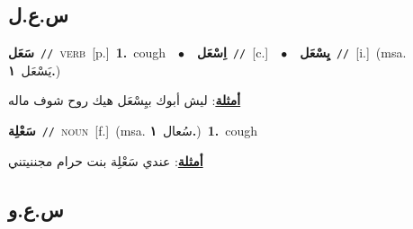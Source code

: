 \documentclass[10pt,a4paper,twoside]{article} %
\begin{document}
\begin{multicols}{2}
\vspace{-3mm}
\subsection*{\color{blue}\foreignlanguage{arabic}{س.ع.ل}\color{blue}{}} 

{\setlength\topsep{0pt}\textbf{\foreignlanguage{arabic}{سَعَل}}\ {\color{gray}\texttt{//}\color{black}}\ \textsc{verb}\ [p.]\ \textbf{1.}~cough\ \ $\bullet$\ \ \setlength\topsep{0pt}\textbf{\foreignlanguage{arabic}{اِسْعَل}}\ {\color{gray}\texttt{//}\color{black}}\ [c.]\ \ $\bullet$\ \ \setlength\topsep{0pt}\textbf{\foreignlanguage{arabic}{يِسْعَل}}\ {\color{gray}\texttt{//}\color{black}}\ [i.]\ \color{gray}(msa. \foreignlanguage{arabic}{يَسْعَل}~\foreignlanguage{arabic}{\textbf{١.}})\color{black}\  \begin{flushright}\color{gray}\foreignlanguage{arabic}{\textbf{\underline{\foreignlanguage{arabic}{أمثلة}}}: ليش أبوك بيِسْعَل هيك روح شوف ماله}\end{flushright}\color{black}} \vspace{2mm}

{\setlength\topsep{0pt}\textbf{\foreignlanguage{arabic}{سَعْلِة}}\ {\color{gray}\texttt{//}\color{black}}\ \textsc{noun}\ [f.]\ \color{gray}(msa. \foreignlanguage{arabic}{سُعال}~\foreignlanguage{arabic}{\textbf{١.}})\color{black}\ \textbf{1.}~cough\  \begin{flushright}\color{gray}\foreignlanguage{arabic}{\textbf{\underline{\foreignlanguage{arabic}{أمثلة}}}: عندي سَعْلِة بنت حرام مجننيتني}\end{flushright}\color{black}} \vspace{2mm}

\vspace{-3mm}
\subsection*{\color{blue}\foreignlanguage{arabic}{س.ع.و}\color{blue}{}} 


\end{multicols}
\end{document}
